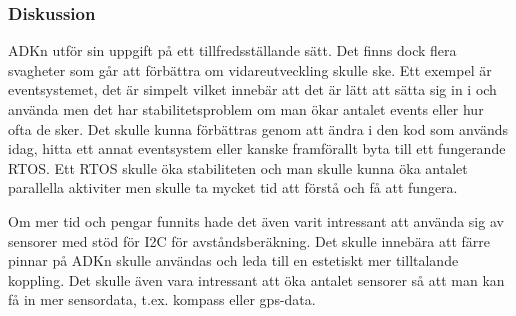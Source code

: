 \subsubsection{Diskussion}
ADKn utför sin uppgift på ett tillfredsställande sätt. 
Det finns dock flera svagheter som går att förbättra om vidareutveckling skulle ske.
Ett exempel är eventsystemet, det är simpelt vilket innebär att det är lätt att sätta sig in i och använda men det
har stabilitetsproblem om man ökar antalet events eller hur ofta de sker. Det skulle kunna förbättras genom att ändra i 
den kod som används idag, hitta ett annat eventsystem eller kanske framförallt byta till ett fungerande RTOS. 
Ett RTOS skulle öka stabiliteten och man skulle kunna öka antalet parallella aktiviter men skulle ta mycket tid att 
förstå och få att fungera.

Om mer tid och pengar funnits hade det även varit intressant att använda sig av sensorer med stöd för I2C för avståndsberäkning. 
Det skulle innebära att färre pinnar på ADKn skulle användas och leda till en estetiskt mer tilltalande koppling. 
Det skulle även vara intressant att öka antalet sensorer så att man kan få in mer sensordata, t.ex. kompass eller gps-data.